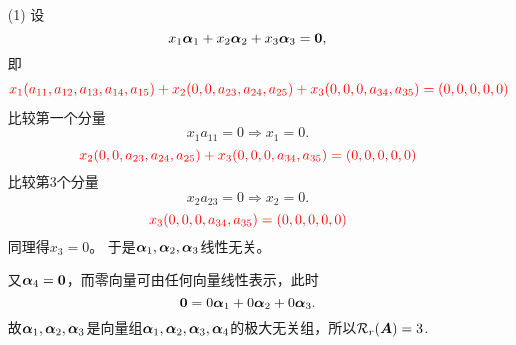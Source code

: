 \begin{frame}
\begin{itemize}
\item[(1)] 设
  $$
  x_1\alphabd_1+x_2\alphabd_2+x_3\alphabd_3=\M0,
  $$
  即
  $$
  \begin{aligned}
    \textcolor{red}{x_1(a_{11},a_{12},a_{13},a_{14},a_{15})+
      x_2(0,0,a_{23},a_{24},a_{25})
      +
      x_3(0,0,0,a_{34},a_{35})=(0,0,0,0,0)}
  \end{aligned}
  $$  
  比较第一个分量
  $$
  x_1a_{11} = 0 \Rightarrow x_1=0.
  $$  \pause 
  $$
  \textcolor{red}{x_2(0,0,a_{23},a_{24},a_{25})+
  x_3(0,0,0,a_{34},a_{35})=(0,0,0,0,0)}
  $$  
  比较第3个分量
  $$
  x_2a_{23} = 0 \Rightarrow x_2=0.
  $$ \pause 
  $$
  \textcolor{red}{x_3(0,0,0,a_{34},a_{35})=(0,0,0,0,0)}
  $$ 
  同理得$x_3=0$。  于是$\boldsymbol{\alpha}_1,\boldsymbol{\alpha}_2,\boldsymbol{\alpha}_3$线性无关。 \pause 
  \vspace{0.1in}

  又$\alphabd_4=\M0$，而零向量可由任何向量线性表示，此时
  $$
  \M0 = 0\alphabd_1+0\alphabd_2+0\alphabd_3.
  $$
  故$\boldsymbol{\alpha}_1,\boldsymbol{\alpha}_2,\boldsymbol{\alpha}_3$是向量组$\boldsymbol{\alpha}_1,\boldsymbol{\alpha}_2,\boldsymbol{\alpha}_3,\boldsymbol{\alpha}_4$的极大无关组，所以$\mathcal{R}_r(\boldsymbol{A})=3$.
\end{itemize}
\end{frame}



